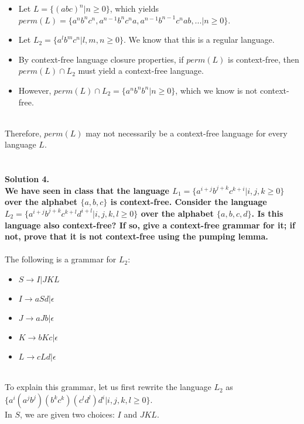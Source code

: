 \documentclass{article}
\begin{document}
\begin{itemize}
    \item Let \(L=\{(abc)^n | n \geq 0\}\), which yields \(perm(L) = \{a^n b^n c^n, a^{n-1}b^n c^n a, a^{n-1} b^{n-1} c^{n} ab, ... | n \geq 0\}\).
    \item Let \(L_2 = \{a^l b^m c^n | l,m,n \geq 0\}\). We know that this is a regular language.
    \item By context-free language closure properties, if \(perm(L)\) is context-free, then \(perm(L)\cap L_2\) must yield a context-free language.
    \item However, \(perm(L)\cap L_2 = \{a^n b^n b^n | n \geq 0\}\), which we know is not context-free.
\end{itemize}
\\Therefore, \(perm(L)\) may not necessarily be a context-free language for every language \(L\).
\\
\\
\\
\noindent \textbf{Solution 4. 
\\We have seen in class that the language \(L_1 = \{a^{i+j}b^{j+k}c^{k+i} | i,j,k \geq 0\}\) over the alphabet \(\{a,b,c\}\) is context-free. Consider the language \(L_2 = \{a^{i+j} b^{j+k} c^{k+l} d^{i+l} | i,j,k,l \geq 0\}\) over the alphabet \(\{a,b,c,d\}\). Is this language also context-free? If so, give a context-free grammar for it; if not, prove that it is not context-free using the pumping lemma.
}
\\
\\The following is a grammar for \(L_2\):
\begin{itemize}
    \item \(S \to I | JKL\)
    \item \(I \to aSd | \epsilon\)
    \item \(J \to aJb | \epsilon\)
    \item \(K \to bKc | \epsilon\)
    \item \(L \to cLd | \epsilon\)
\end{itemize}
\\To explain this grammar, let us first rewrite the language \(L_2\) as \(\{a^i (a^j b^j) (b^k c^k) (c^l d^l) d^i | i,j,k,l \geq 0\}\).
\\In \(S\), we are given two choices: \(I\) and \(JKL\).
\end{document}
